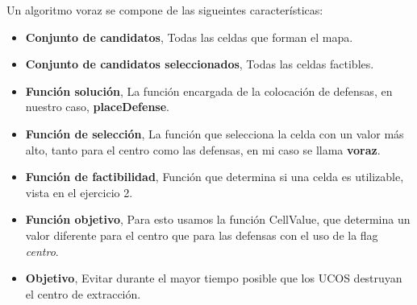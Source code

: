 Un algoritmo voraz se compone de las sigueintes características:
\begin{itemize}
\item \textbf{Conjunto de candidatos}, Todas las celdas que forman el mapa.
\item \textbf{Conjunto de candidatos seleccionados}, Todas las celdas factibles.
\item \textbf{Función solución}, La función encargada de la colocación de defensas, en nuestro caso, \textbf{placeDefense}.
\item \textbf{Función de selección}, La función que selecciona la celda con un valor más alto, tanto para el centro como las defensas, en mi caso se llama \textbf{voraz}.
\item \textbf{Función de factibilidad}, Función que determina si una celda es utilizable, vista en el ejercicio 2.
\item \textbf{Función objetivo}, Para esto usamos la función CellValue, que determina un valor diferente para el centro que para las defensas con el uso de la flag \textit{centro}.
\item \textbf{Objetivo}, Evitar durante el mayor tiempo posible que los UCOS destruyan el centro de extracción.
\end{itemize}
\pagebreak